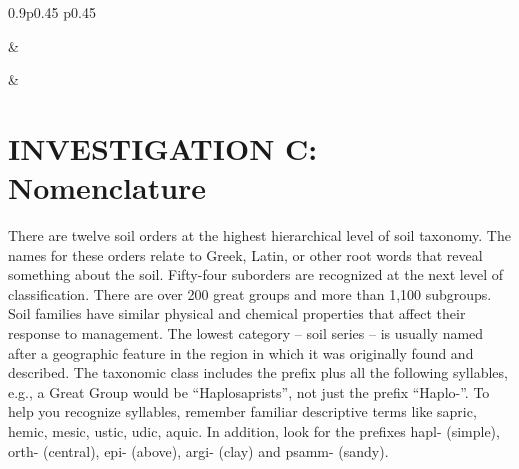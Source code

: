 \documentclass[
  letterpaper,
  twocolumn,
  portrait]{scrbook}
\begin{document}
\begin{table}[h!]
\begin{centerbox}
\begin{threeparttable}
\begin{tabularx}{0.9\textwidth}{p{} p{}}
\hhline{}

 &
 \tabularnewline[-0.5pt]


\hhline{}

 &
 \tabularnewline[-0.5pt]


\hhline{}
\end{tabularx}
\end{threeparttable}\par\end{centerbox}

\end{table}
 

\hypertarget{investigation-c-nomenclature}{%
\section{INVESTIGATION C:
Nomenclature}\label{investigation-c-nomenclature}}

There are twelve soil orders at the highest hierarchical level of soil
taxonomy. The names for these orders relate to Greek, Latin, or other
root words that reveal something about the soil. Fifty-four suborders
are recognized at the next level of classification. There are over 200
great groups and more than 1,100 subgroups. Soil families have similar
physical and chemical properties that affect their response to
management. The lowest category -- soil series -- is usually named after
a geographic feature in the region in which it was originally found and
described. The taxonomic class includes the prefix plus all the
following syllables, e.g., a Great Group would be ``Haplosaprists'', not
just the prefix ``Haplo-''. To help you recognize syllables, remember
familiar descriptive terms like sapric, hemic, mesic, ustic, udic,
aquic. In addition, look for the prefixes hapl- (simple), orth-
(central), epi- (above), argi- (clay) and psamm- (sandy).
\end{document}
